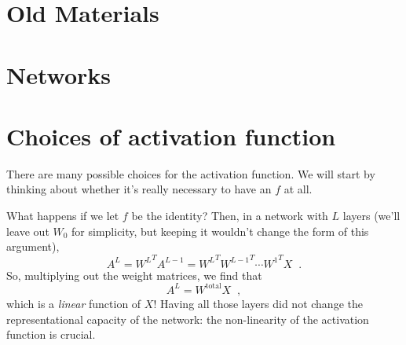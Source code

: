 \section{Old Materials}



\section{Networks}



\section{Choices of activation function}

There are many possible choices for the activation function.  We will
start by thinking about whether it's really necessary to have an $f$
at all.

What happens if we let $f$ be the identity?  Then, in a network with
$L$ layers (we'll leave out $W_0$ for simplicity, but keeping it
wouldn't change the form of this argument), 
\[A^L = {W^L}^T A^{L-1} = 
 {W^L}^T {W^{L-1}}^T \cdots {W^1}^T X\;\;.\]
So, multiplying out the weight matrices, we find that 
\[A^L = W^\text{total}X\;\;,\]
which is a {\em linear} function of $X$!
Having all those layers did not change the representational
capacity of the network: the non-linearity of the activation function
is crucial.

